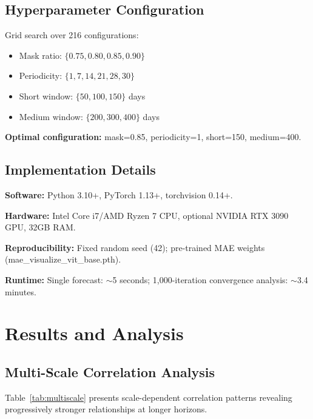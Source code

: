 \documentclass[preprint,12pt,authoryear]{elsarticle}
\begin{document}
\subsection{Hyperparameter Configuration}

Grid search over 216 configurations:
\begin{itemize}
    \item Mask ratio: $\{0.75, 0.80, 0.85, 0.90\}$
    \item Periodicity: $\{1, 7, 14, 21, 28, 30\}$
    \item Short window: $\{50, 100, 150\}$ days
    \item Medium window: $\{200, 300, 400\}$ days
\end{itemize}

\textbf{Optimal configuration:} mask=0.85, periodicity=1, short=150, medium=400.

\subsection{Implementation Details}

\textbf{Software:} Python 3.10+, PyTorch 1.13+, torchvision 0.14+.

\textbf{Hardware:} Intel Core i7/AMD Ryzen 7 CPU, optional NVIDIA RTX 3090 GPU, 32GB RAM.

\textbf{Reproducibility:} Fixed random seed (42); pre-trained MAE weights (mae\_visualize\_vit\_base.pth).

\textbf{Runtime:} Single forecast: $\sim$5 seconds; 1,000-iteration convergence analysis: $\sim$3.4 minutes.

\section{Results and Analysis}
\label{sec:results}

\subsection{Multi-Scale Correlation Analysis}

Table~\ref{tab:multiscale} presents scale-dependent correlation patterns revealing progressively stronger relationships at longer horizons.
\end{document}

